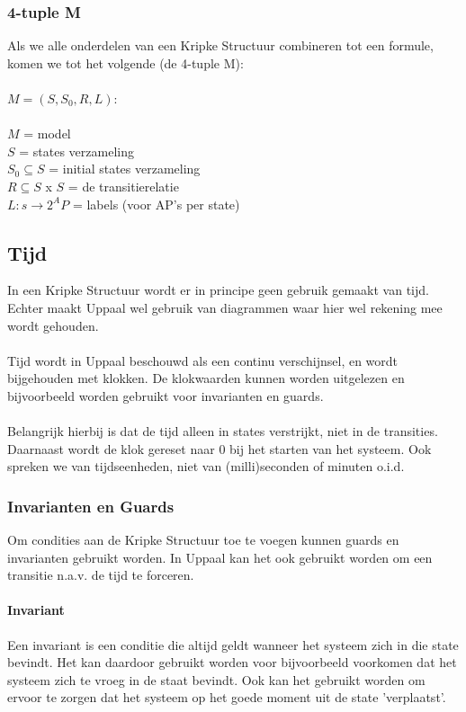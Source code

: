 \documentclass{article}
\begin{document}
    \subsubsection{4-tuple M}
      Als we alle onderdelen van een Kripke Structuur combineren tot een formule, komen we tot het volgende (de 4-tuple M):\\\\
      $ M = (S, S_0, R, L) $:\\\\
      $M$ = model \\
      $S$ = states verzameling \\
      $S_0 \subseteq S$ = initial states verzameling \\
      $R \subseteq S$ x $S$ = de transitierelatie \\
      $L: s \rightarrow 2^AP$ = labels (voor AP's per state)


  \subsection{Tijd}
    In een Kripke Structuur wordt er in principe geen gebruik gemaakt van tijd. Echter maakt Uppaal wel gebruik van diagrammen waar hier wel rekening mee wordt gehouden. \\\\
    Tijd wordt in Uppaal beschouwd als een continu verschijnsel, en wordt bijgehouden met klokken. De klokwaarden kunnen worden uitgelezen en bijvoorbeeld worden gebruikt voor invarianten en guards. \\\\
    Belangrijk hierbij is dat de tijd alleen in states verstrijkt, niet in de transities. Daarnaast wordt de klok gereset naar 0 bij het starten van het systeem. Ook spreken we van tijdseenheden, niet van (milli)seconden of minuten o.i.d.

    \subsubsection{Invarianten en Guards}
      Om condities aan de Kripke Structuur toe te voegen kunnen guards en invarianten gebruikt worden. In Uppaal kan het ook gebruikt worden om een transitie n.a.v. de tijd te forceren.

      \paragraph{Invariant}
        Een invariant is een conditie die altijd geldt wanneer het systeem zich in die state bevindt. Het kan daardoor gebruikt worden voor bijvoorbeeld voorkomen dat het systeem zich te vroeg in de staat bevindt. Ook kan het gebruikt worden om ervoor te zorgen dat het systeem op het goede moment uit de state 'verplaatst'.
\end{document}
